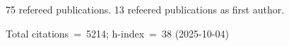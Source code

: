 75 refereed publications. 13 refeered publications as first author.

Total citations~=~5214; h-index~=~38 (2025-10-04)
